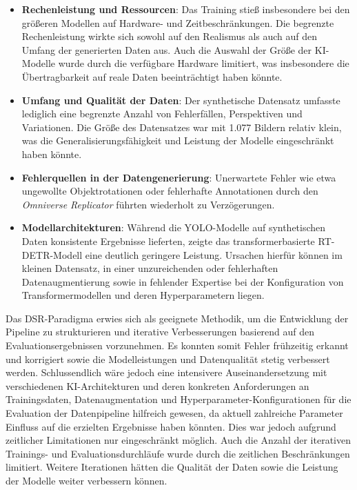\begin{itemize}
    \item \textbf{Rechenleistung und Ressourcen}: Das Training stieß insbesondere bei den größeren Modellen auf Hardware- und Zeitbeschränkungen. Die begrenzte Rechenleistung wirkte sich sowohl auf den Realismus als auch auf den Umfang der generierten Daten aus. Auch die Auswahl der Größe der \ac{KI}-Modelle wurde durch die verfügbare Hardware limitiert, was insbesondere die Übertragbarkeit auf reale Daten beeinträchtigt haben könnte.
    \item \textbf{Umfang und Qualität der Daten}: Der synthetische Datensatz umfasste lediglich eine begrenzte Anzahl von Fehlerfällen, Perspektiven und Variationen. Die Größe des Datensatzes war mit 1.077 Bildern relativ klein, was die Generalisierungsfähigkeit und Leistung der Modelle eingeschränkt haben könnte.
    \item \textbf{Fehlerquellen in der Datengenerierung}: Unerwartete Fehler wie etwa ungewollte Objektrotationen oder fehlerhafte Annotationen durch den \textit{Omniverse Replicator} führten wiederholt zu Verzögerungen.
    \item \textbf{Modellarchitekturen}: Während die \ac{YOLO}-Modelle auf synthetischen Daten konsistente Ergebnisse lieferten, zeigte das transformerbasierte \ac{RT-DETR}-Modell eine deutlich geringere Leistung. Ursachen hierfür können im kleinen Datensatz, in einer unzureichenden oder fehlerhaften Datenaugmentierung sowie in fehlender Expertise bei der Konfiguration von Transformermodellen und deren Hyperparametern liegen.
\end{itemize}

Das \ac{DSR}-Paradigma erwies sich als geeignete Methodik, um die Entwicklung der Pipeline zu strukturieren und iterative Verbesserungen basierend auf den Evaluationsergebnissen vorzunehmen. Es konnten somit Fehler frühzeitig erkannt und korrigiert sowie die Modelleistungen und Datenqualität stetig verbessert werden. Schlussendlich wäre jedoch eine intensivere Auseinandersetzung mit verschiedenen \ac{KI}-Architekturen und deren konkreten Anforderungen an Trainingsdaten, Datenaugmentation und Hyperparameter-Konfigurationen für die Evaluation der Datenpipeline hilfreich gewesen, da aktuell zahlreiche Parameter Einfluss auf die erzielten Ergebnisse haben könnten. Dies war jedoch aufgrund zeitlicher Limitationen nur eingeschränkt möglich. Auch die Anzahl der iterativen Trainings- und Evaluationsdurchläufe wurde durch die zeitlichen Beschränkungen limitiert. Weitere Iterationen hätten die Qualität der Daten sowie die Leistung der Modelle weiter verbessern können.


